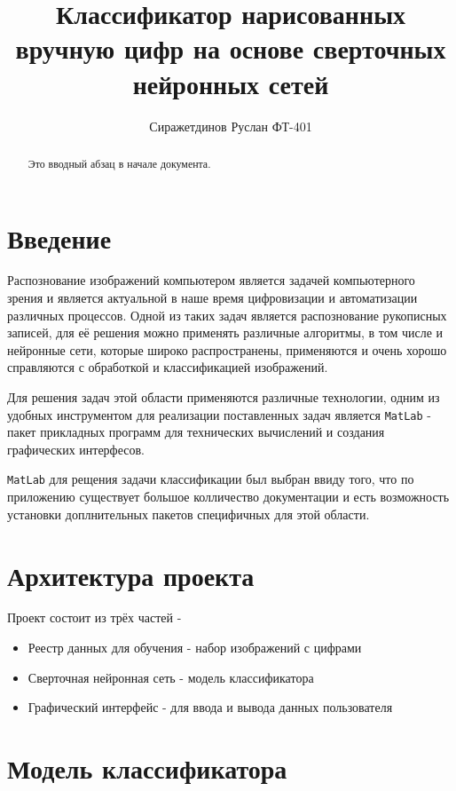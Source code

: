 \documentclass{article}
\title{Классификатор нарисованных вручную цифр на основе сверточных нейронных сетей}
\author{Сиражетдинов Руслан ФТ-401}
\begin{document}
\maketitle
\newpage

\tableofcontents
\newpage

\begin{abstract}
  Это вводный абзац в начале документа.
\end{abstract}
 
\section{Введение}
Распознование изображений компьютером является задачей компьютерного зрения и является актуальной в наше время цифровизации и автоматизации различных процессов. Одной из таких задач является распознование рукописных записей, для её решения можно применять различные алгоритмы, в том числе и нейронные сети, которые широко распространены, применяются и очень хорошо справляются с обработкой и классификацией изображений.

Для решения задач этой области применяются различные технологии, одним из удобных инструментом для реализации поставленных задач является \verb|MatLab| - пакет прикладных программ для технических вычислений и создания графических интерфесов.

\verb|MatLab| для рещения задачи классификации был выбран ввиду того, что по приложению существует большое колличество документации и есть возможность установки доплнительных пакетов специфичных для этой области.
\newpage


\section{Архитектура проекта}
Проект состоит из трёх частей - 
\begin{itemize}
  \item Реестр данных для обучения - набор изображений с цифрами
  \item Сверточная нейронная сеть - модель классификатора
  \item Графический интерфейс - для ввода и вывода данных пользователя
\end{itemize}
\newpage


\section{Модель классификатора}
\newpage
\end{document}
